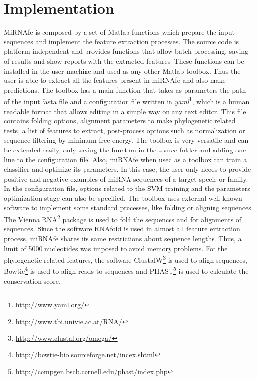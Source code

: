 \documentclass{article}
\begin{document}
\section{Implementation}
MiRNAfe is composed by a set of Matlab functions which prepare the input sequences and implement the feature extraction processes. The source code is platform 
independent and provides functions that allow batch processing, saving of results and show reports with the extracted features. These functions can be 
installed in the user machine and used as any other Matlab toolbox. Thus the user is able to extract all the features present in miRNAfe and also make 
predictions. The toolbox has a main function that takes as parameters the path of the input fasta file and a configuration file written in 
\textit{yaml}\footnote{\url{http://www.yaml.org/}}, which is a human readable format that allows editing in a simple way on any text editor. This file contains 
folding options, alignment parameters to make phylogenetic related tests, a list of features to extract, post-process options such as normalization or sequence 
filtering by minimum free energy. The toolbox is very versatile and can be extended easily, only saving the function in the source folder and adding one line 
to the configuration file. Also, miRNAfe when used as a toolbox  can train a classifier and optimize its parameters. In this case, the user only needs to 
provide positive and negative examples of miRNA sequences of a target specie or family. In the configuration file, options related to the SVM training and the 
parameters optimization stage can also be specified.
The toolbox uses external well-known software to implement some standard processes, like folding or aligning sequences. The Vienna 
RNA\footnote{\url{http://www.tbi.univie.ac.at/RNA/}} package is used to fold the sequences and for alignments of sequences. Since the software RNAfold is used 
in almost all feature extraction process, miRNAfe shares its same restrictions about sequence lengths. Thus, a limit of 5000 nucleotides was imposed to avoid 
memory problems. For the phylogenetic related features, the software ClustalW\footnote{\url{http://www.clustal.org/omega/}} is used to align sequences, 
Bowtie\footnote{\url{http://bowtie-bio.sourceforge.net/index.shtml}} is used to align reads to sequences and 
PHAST\footnote{\url{http://compgen.bscb.cornell.edu/phast/index.php}} is used to calculate the conservation score.
\end{document}
